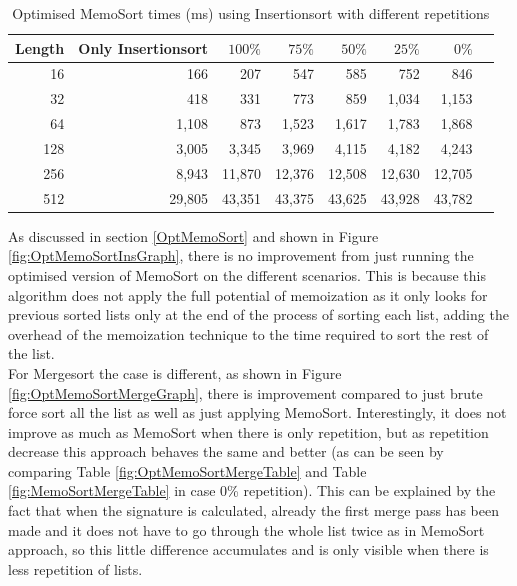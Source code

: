\documentclass[a4paper,12pt]{article}
\begin{document}
\begin{table}[H]
\centering
\begin{tabular}{|r|r|r|r|r|r|r|r|}   \hline
	{Length} & {Only Insertionsort} & {$100\%$} & {$75\%$} & {$50\%$} & {$25\%$} & {$0\%$} \\  \hline
	16 &166&207&547 & 585 & 752 & 846\\ 
	32 &418&331&773 & 859& 1,034& 1,153\\ 
	64 &1,108&873 &1,523&1,617&1,783& 1,868\\ 
	128 &3,005&3,345&3,969&4,115&4,182 &4,243\\ 
	256 &8,943&11,870&12,376 &12,508&12,630&12,705\\ 
	512 &29,805 & 43,351&43,375 &43,625 &43,928 &43,782\\  \hline
\end{tabular}
\caption{Optimised MemoSort times (ms) using Insertionsort with different repetitions}
\label{fig:OptMemoSortInsTable}
\end{table}


As discussed in section \ref{OptMemoSort} and shown in Figure \ref{fig:OptMemoSortInsGraph}, there is no improvement from just running the optimised version of MemoSort on the different scenarios. This is because this algorithm does not apply the full potential of memoization as it only looks for previous sorted lists only at the end of the process of sorting each list, adding the overhead of the memoization technique to the time required to sort the rest of the list. \\

For Mergesort the case is different, as shown in Figure \ref{fig:OptMemoSortMergeGraph}, there is improvement compared to just brute force sort all the list as well as just applying MemoSort. Interestingly, it does not improve as much as MemoSort when there is only repetition, but as repetition decrease this approach behaves the same and better (as can be seen by comparing Table \ref{fig:OptMemoSortMergeTable} and Table \ref{fig:MemoSortMergeTable} in case 0\% repetition). This can be explained by the fact that when the signature is calculated, already the first merge pass has been made and it does not have to go through the whole list twice as in MemoSort approach, so this little difference accumulates and is only visible when there is less repetition of lists.
\end{document}
